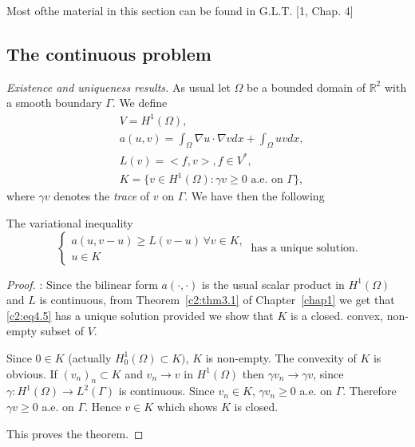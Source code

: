 Most of\pageoriginale  the material in this section can be found in G.L.T. [1,
  Chap. 4]  

\subsection{The continuous problem}\label{c2:ss4.1} 

\textit{Existence and uniqueness results.} As usual let $\Omega$ be a
bounded domain of $\mathbb{R}^2$ with a smooth boundary $\Gamma$. We
define  
\begin{align*}
& V = H^1 (\Omega), \tag{4.1}\label{c2:4.1}\\
& a (u, v)= \int_\Omega \nabla u \cdot \nabla v dx +
  \int_\Omega uv dx, \tag{4.2}\label{c2:eq4.2}\\ 
& L(v) = < f, v> , f \in V^*,\tag{4.3}\label{c2:eq4.3}\\
& K = \{v \in H^1(\Omega) : \gamma v \geq 0 \text{ a.e. on }
  \Gamma\}, \tag{4.4}\label{c2:eq4.4}  
\end{align*}
where $\gamma v$ denotes the \textit{trace} of $v$ on $\Gamma$. We
have then the following  

\begin{theorem}\label{c2:thm4.1}%
The variational inequality 
\begin{equation}
\begin{cases}
 a (u, v-u) \geq L (v-u)\, \forall  v \in K,\\
 u \in K \tag{4.5}\label{c2:eq4.5}
 \end{cases}
 ~\text{has a unique solution.}
\end{equation}
\end{theorem}

\begin{proof}:
Since the bilinear form $a(\cdot, \cdot)$ is the usual scalar product
in $H^1 (\Omega)$ and $L$ is continuous, from Theorem~\ref{c2:thm3.1} of Chapter~\ref{chap1}
we  get that \eqref{c2:eq4.5} has a unique solution provided we show that $K$ is
a closed. convex, non-empty subset of $V$.   

Since $0 \in K$ (actually $H^1_0 (\Omega) \subset K)$, $K$ is
non-empty. The convexity of $K$ is obvious. If $(v_n)_n \subset K$ and
$v_n \to v$ in $H^1(\Omega)$ then $\gamma v_n \to  \gamma v$, since
$\gamma : H^1 (\Omega) \to L^2 (\Gamma)$ is continuous. Since $v_n
\in K$, $\gamma v_n \geq 0$ a.e. on $\Gamma$. Therefore $\gamma v
\geq 0$ a.e. on $\Gamma$.  Hence $v \in K$ which shows $K$ is
closed. 

This proves the theorem.
\end{proof}

